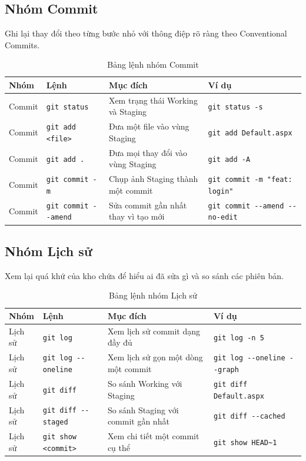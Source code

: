 \subsection{Nhóm Commit}
Ghi lại thay đổi theo từng bước nhỏ với thông điệp rõ ràng theo Conventional Commits.
\begin{table}[H]
\centering
\small
\begin{tabular}{p{1.7cm} p{3.2cm} p{4.5cm} p{4.6cm}}
\toprule
Nhóm & Lệnh & Mục đích & Ví dụ \\
\midrule
Commit & \verb|git status| & Xem trạng thái Working và Staging & \verb|git status -s| \\
Commit & \verb|git add <file>| & Đưa một file vào vùng Staging & \verb|git add Default.aspx| \\
Commit & \verb|git add .| & Đưa mọi thay đổi vào vùng Staging & \verb|git add -A| \\
Commit & \verb|git commit -m| & Chụp ảnh Staging thành một commit & \verb|git commit -m "feat: login"| \\
Commit & \verb|git commit --amend| & Sửa commit gần nhất thay vì tạo mới & \verb|git commit --amend --no-edit| \\
\bottomrule
\end{tabular}
\caption{Bảng lệnh nhóm Commit}
\label{tab:pa-commit}
\end{table}

\subsection{Nhóm Lịch sử}
Xem lại quá khứ của kho chứa để hiểu ai đã sửa gì và so sánh các phiên bản.
\begin{table}[H]
\centering
\small
\begin{tabular}{p{1.7cm} p{3.2cm} p{4.5cm} p{4.6cm}}
\toprule
Nhóm & Lệnh & Mục đích & Ví dụ \\
\midrule
Lịch sử & \verb|git log| & Xem lịch sử commit dạng đầy đủ & \verb|git log -n 5| \\
Lịch sử & \verb|git log --oneline| & Xem lịch sử gọn một dòng một commit & \verb|git log --oneline --graph| \\
Lịch sử & \verb|git diff| & So sánh Working với Staging & \verb|git diff Default.aspx| \\
Lịch sử & \verb|git diff --staged| & So sánh Staging với commit gần nhất & \verb|git diff --cached| \\
Lịch sử & \verb|git show <commit>| & Xem chi tiết một commit cụ thể & \verb|git show HEAD~1| \\
\bottomrule
\end{tabular}
\caption{Bảng lệnh nhóm Lịch sử}
\label{tab:pa-lichsu}
\end{table}

